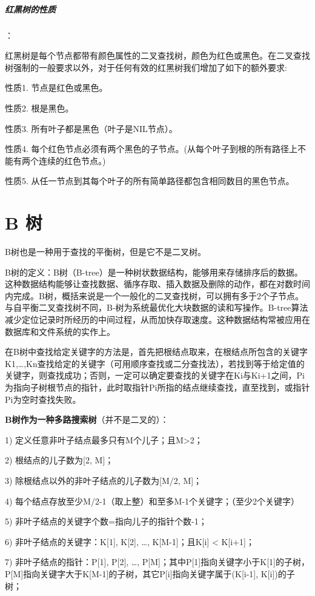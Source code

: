 \documentclass[UTF8,a4paper,12pt]{ctexbook}
\begin{document}
			
			\subparagraph{红黑树的性质}：
			
				红黑树是每个节点都带有颜色属性的二叉查找树，颜色为红色或黑色。在二叉查找树强制的一般要求以外，对于任何有效的红黑树我们增加了如下的额外要求:
				
				性质1. 节点是红色或黑色。
				
				性质2. 根是黑色。
				
				性质3. 所有叶子都是黑色（叶子是NIL节点）。
				
				性质4. 每个红色节点必须有两个黑色的子节点。(从每个叶子到根的所有路径上不能有两个连续的红色节点。)
				
				性质5. 从任一节点到其每个叶子的所有简单路径都包含相同数目的黑色节点。
				
				
		\section{B 树}
			B树也是一种用于查找的平衡树，但是它不是二叉树。
			
			B树的定义：B树（B-tree）是一种树状数据结构，能够用来存储排序后的数据。这种数据结构能够让查找数据、循序存取、插入数据及删除的动作，都在对数时间内完成。B树，概括来说是一个一般化的二叉查找树，可以拥有多于2个子节点。与自平衡二叉查找树不同，B-树为系统最优化大块数据的读和写操作。B-tree算法减少定位记录时所经历的中间过程，从而加快存取速度。这种数据结构常被应用在数据库和文件系统的实作上。
			
			在B树中查找给定关键字的方法是，首先把根结点取来，在根结点所包含的关键字K1,…,Kn查找给定的关键字（可用顺序查找或二分查找法），若找到等于给定值的关键字，则查找成功；否则，一定可以确定要查找的关键字在Ki与Ki+1之间，Pi为指向子树根节点的指针，此时取指针Pi所指的结点继续查找，直至找到，或指针Pi为空时查找失败。
			
			\textbf{B树作为一种多路搜索树}（并不是二叉的）：
			
			1) 定义任意非叶子结点最多只有M个儿子；且M>2；
			
			2) 根结点的儿子数为[2, M]；
			
			3) 除根结点以外的非叶子结点的儿子数为[M/2, M]；
			
			4) 每个结点存放至少M/2-1（取上整）和至多M-1个关键字；（至少2个关键字）
			
			5) 非叶子结点的关键字个数=指向儿子的指针个数-1；
			
			6) 非叶子结点的关键字：K[1], K[2], …, K[M-1]；且K[i] < K[i+1]；
			
			7) 非叶子结点的指针：P[1], P[2], …, P[M]；其中P[1]指向关键字小于K[1]的子树，P[M]指向关键字大于K[M-1]的子树，其它P[i]指向关键字属于(K[i-1], K[i])的子树；
			
\end{document}
